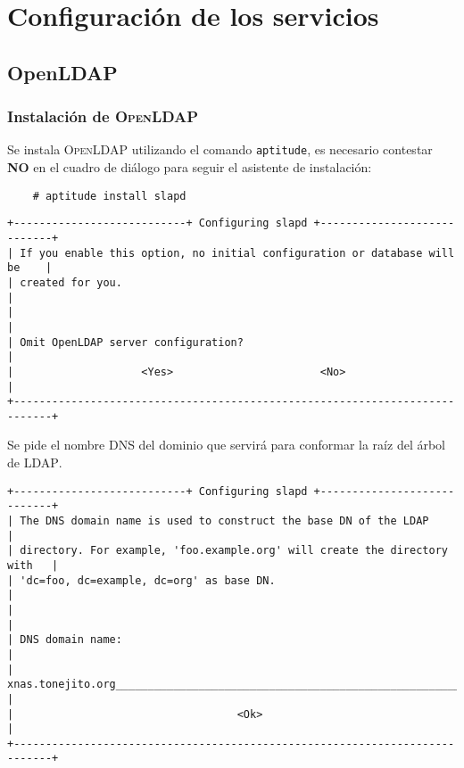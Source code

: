     \section {Configuraci\'{o}n de los servicios}

      \subsection {OpenLDAP}

          \subsubsection {Instalaci\'{o}n de \textsc{OpenLDAP}}

Se instala \textsc{OpenLDAP} utilizando el comando \texttt{aptitude}, es necesario contestar \textbf{NO} en el cuadro de di\'{a}logo para seguir el asistente de instalaci\'{o}n:

{
\scriptsize
\linespread{1}
\begin{verbatim}
    # aptitude install slapd
\end{verbatim}
}


{
\scriptsize
\linespread{1}
\begin{verbatim}
+---------------------------+ Configuring slapd +----------------------------+
| If you enable this option, no initial configuration or database will be    |
| created for you.                                                           |
|                                                                            |
| Omit OpenLDAP server configuration?                                        |
|                    <Yes>                       <No>                        |
+----------------------------------------------------------------------------+
\end{verbatim}
}

Se pide el nombre DNS del dominio que servir\'{a} para conformar la ra\'{i}z del \'{a}rbol de \textsc{LDAP}.

{
\scriptsize
\linespread{1}
\begin{verbatim}
+---------------------------+ Configuring slapd +----------------------------+
| The DNS domain name is used to construct the base DN of the LDAP           |
| directory. For example, 'foo.example.org' will create the directory with   |
| 'dc=foo, dc=example, dc=org' as base DN.                                   |
|                                                                            |
| DNS domain name:                                                           |
| xnas.tonejito.org_________________________________________________________ |
|                                   <Ok>                                     |
+----------------------------------------------------------------------------+
\end{verbatim}
}

